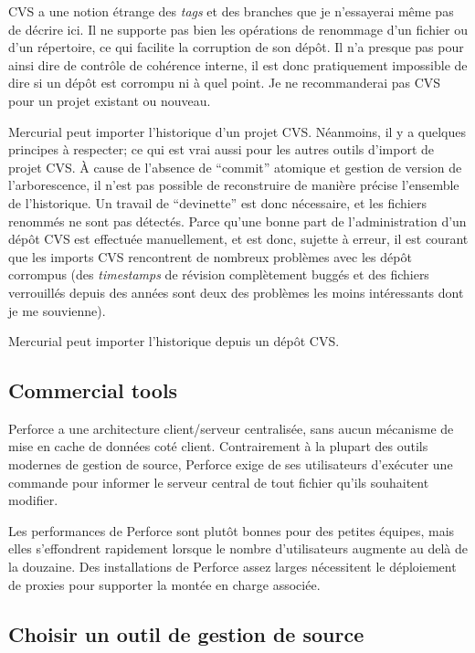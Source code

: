 CVS a une notion étrange des \textit{tags} et des branches que je n'essayerai
même pas de décrire ici. Il ne supporte pas bien les opérations de renommage d'un 
fichier ou d'un répertoire, ce qui facilite la corruption de son dépôt. Il n'a
presque pas pour ainsi dire de contrôle de cohérence interne, il est donc 
pratiquement impossible de dire si un dépôt est corrompu ni à quel point. Je
ne recommanderai pas CVS pour un projet existant ou nouveau.

Mercurial peut importer l'historique d'un projet CVS. Néanmoins, il y a 
quelques principes à respecter; ce qui est vrai aussi pour les autres
outils d'import de projet CVS. À cause de l'absence de ``commit'' atomique
et gestion de version de l'arborescence, il n'est pas possible de reconstruire
de manière précise l'ensemble de l'historique. Un travail de ``devinette''
est donc nécessaire, et les fichiers renommés ne sont pas détectés. Parce 
qu'une bonne part de l'administration d'un dépôt CVS est effectuée manuellement, 
et est donc, sujette à erreur, il est courant que les imports CVS rencontrent 
de nombreux problèmes avec les dépôt corrompus (des \textit{timestamps} 
de révision complètement buggés et des fichiers verrouillés depuis des années 
sont deux des problèmes les moins intéressants dont je me souvienne).

Mercurial peut importer l'historique depuis un dépôt CVS.

\subsection{Commercial tools}

Perforce a une architecture client/serveur centralisée, sans aucun
mécanisme de mise en cache de données coté client. Contrairement à la plupart
des outils modernes de gestion de source, Perforce exige de ses 
utilisateurs d'exécuter une commande pour informer le serveur
central de tout fichier qu'ils souhaitent modifier.

Les performances de Perforce sont plutôt bonnes pour des petites
équipes, mais elles s'effondrent rapidement lorsque le nombre 
d'utilisateurs augmente au delà de la douzaine. Des installations 
de Perforce assez larges nécessitent le déploiement de proxies pour 
supporter la montée en charge associée.

\subsection{Choisir un outil de gestion de source}

